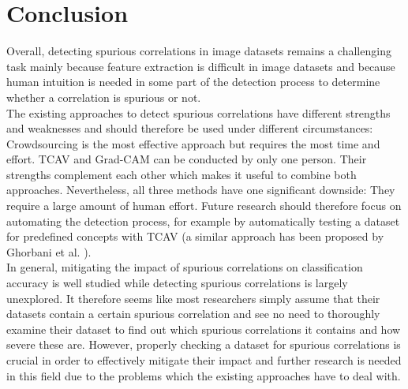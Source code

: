 \documentclass{article}
\begin{document}
\section{Conclusion}
Overall, detecting spurious correlations in image datasets remains a challenging task mainly because feature extraction is difficult in image datasets and
because human intuition is needed in some part of the detection process to determine whether a correlation is spurious or not. \\
The existing approaches to detect spurious correlations have different strengths and weaknesses and should therefore be used under different circumstances: 
Crowdsourcing is the most effective approach but requires the most time and effort. TCAV and Grad-CAM can be conducted by only one person. 
Their strengths complement each other which makes it useful to combine both approaches. Nevertheless, all three methods have one significant downside: 
They require a large amount of human effort. Future research should therefore focus on automating the detection process, for example by automatically testing
a dataset for predefined concepts with TCAV (a similar approach has been proposed by Ghorbani et al. \cite{ghorbani2019automating}). \\
In general, mitigating the impact of spurious correlations on classification accuracy is well studied while detecting spurious correlations is
largely unexplored. It therefore seems like most researchers simply assume that their datasets contain a certain spurious correlation and see no need to
thoroughly examine their dataset to find out which spurious correlations it contains and how severe these are. However, properly checking a dataset for spurious
correlations is crucial in order to effectively mitigate their impact and further research is needed in this field due to the problems which the existing approaches
have to deal with.


\printbibliography
\end{document}
